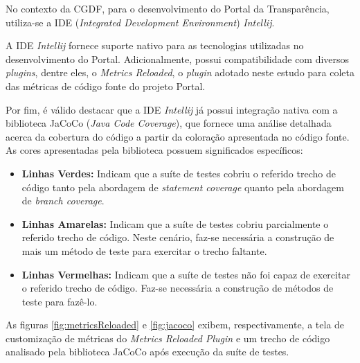 No contexto da CGDF, para o desenvolvimento do Portal da Transparência, utiliza-se a IDE (\textit{Integrated Development Environment}) \textit{Intellij}.

A IDE \textit{Intellij} fornece suporte nativo para as tecnologias utilizadas no desenvolvimento do Portal. Adicionalmente, possui compatibilidade com diversos \textit{plugins}, dentre eles, o \textit{Metrics Reloaded}, o \textit{plugin} adotado neste estudo para coleta das métricas de código fonte do projeto Portal.

Por fim, é válido destacar que a IDE \textit{Intellij} já possui integração nativa com a biblioteca JaCoCo (\textit{Java Code Coverage}), que fornece uma análise detalhada acerca da cobertura do código a partir da coloração apresentada no código fonte. As cores apresentadas pela biblioteca possuem significados específicos:

\begin{itemize}
	\item \textbf{Linhas Verdes:} Indicam que a suíte de testes cobriu o referido trecho de código tanto pela abordagem de \textit{statement coverage} quanto pela abordagem de \textit{branch coverage}.

	\item \textbf{Linhas Amarelas:} Indicam que a suíte de testes cobriu parcialmente o referido trecho de código. Neste cenário, faz-se necessária a construção de mais um método de teste para exercitar o trecho faltante.

	\item \textbf{Linhas Vermelhas:} Indicam que a suíte de testes não foi capaz de exercitar o referido trecho de código. Faz-se necessária a construção de métodos de teste para fazê-lo.
\end{itemize}

As figuras \ref{fig:metricsReloaded} e \ref{fig:jacoco} exibem, respectivamente, a tela de customização de métricas do \textit{Metrics Reloaded Plugin} e um trecho de código analisado pela biblioteca JaCoCo após execução da suíte de testes.

